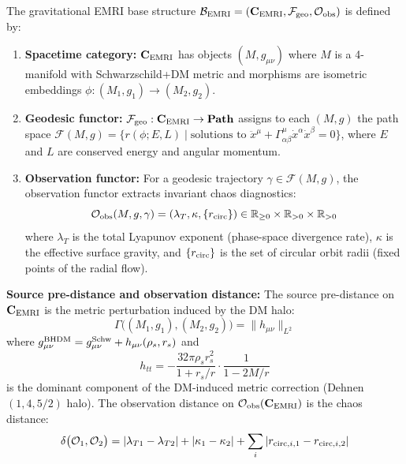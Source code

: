\begin{definition}\label{def:base-emri}
The gravitational EMRI base structure $\mathcal{B}_{\rm EMRI} = (\mathbf{C}_{\rm EMRI}, \mathcal{F}_{\rm geo}, \mathcal{O}_{\rm obs})$ is defined by:
\begin{enumerate}
\item \textbf{Spacetime category:} $\mathbf{C}_{\rm EMRI}$ has objects $(M, g_{\mu\nu})$ where $M$ is a 4-manifold with Schwarzschild+DM metric and morphisms are isometric embeddings $\phi: (M_1, g_1) \to (M_2, g_2)$.

\item \textbf{Geodesic functor:} $\mathcal{F}_{\rm geo}: \mathbf{C}_{\rm EMRI} \to \mathbf{Path}$ assigns to each $(M, g)$ the path space $\mathcal{F}(M, g) = \{r(\phi; E, L) \mid \text{solutions to } \ddot{x}^\mu + \Gamma^\mu_{\alpha\beta}\dot{x}^\alpha\dot{x}^\beta = 0\}$, where $E$ and $L$ are conserved energy and angular momentum.

\item \textbf{Observation functor:} For a geodesic trajectory $\gamma \in \mathcal{F}(M, g)$, the observation functor extracts invariant chaos diagnostics:
\begin{equation}
\mathcal{O}_{\rm obs}(M, g, \gamma) = (\lambda_T, \kappa, \{r_{\rm circ}\}) \in \mathbb{R}_{\geq 0} \times \mathbb{R}_{>0} \times \mathbb{R}_{>0}
\end{equation}
where $\lambda_T$ is the total Lyapunov exponent (phase-space divergence rate), $\kappa$ is the effective surface gravity, and $\{r_{\rm circ}\}$ is the set of circular orbit radii (fixed points of the radial flow).
\end{enumerate}
\end{definition}

\textbf{Source pre-distance and observation distance:} The source pre-distance on $\mathbf{C}_{\rm EMRI}$ is the metric perturbation induced by the DM halo:
\begin{equation}
\Gamma\bigl((M_1, g_1), (M_2, g_2)\bigr) = \|h_{\mu\nu}\|_{L^2}
\end{equation}
where $g_{\mu\nu}^{\rm BHDM} = g_{\mu\nu}^{\rm Schw} + h_{\mu\nu}(\rho_s, r_s)$ and
\begin{equation}
h_{tt} = -\frac{32\pi\rho_s r_s^2}{1 + r_s/r} \cdot \frac{1}{1 - 2M/r}
\end{equation}
is the dominant component of the DM-induced metric correction (Dehnen $(1, 4, 5/2)$ halo). The observation distance on $\mathcal{O}_{\rm obs}(\mathbf{C}_{\rm EMRI})$ is the chaos distance:
\begin{equation}
\delta\bigl(\mathcal{O}_1, \mathcal{O}_2\bigr) = |\lambda_{T1} - \lambda_{T2}| + |\kappa_1 - \kappa_2| + \sum_i |r_{{\rm circ}, i, 1} - r_{{\rm circ}, i, 2}|
\end{equation}

